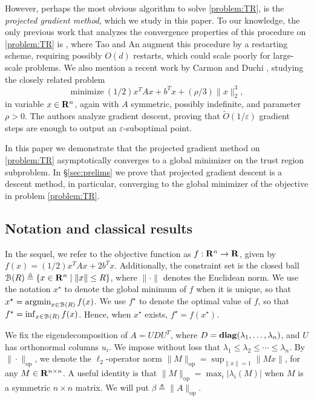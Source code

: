 \documentclass[11pt]{article}
\let\epsilon\varepsilon
\begin{document}
However, perhaps the most obvious algorithm to solve \eqref{problem:TR}, is the
\emph{projected gradient method}, which we study in this paper. To our knowledge, the only previous work 
that analyzes the convergence properties of this procedure on 
\eqref{problem:TR} is \cite{tao1998}, where Tao and An augment this procedure by a restarting scheme, requiring 
possibly $O(d)$ restarts, which could scale poorly for large-scale problems. 
We also mention a recent work by Carmon and Duchi \cite{carmon2016}, studying the closely related problem
\begin{equation}\label{problem:QP}
\text{minimize}~ (1/2)x^T A x + b^Tx + (\rho/3) \|x\|_2^3,
\end{equation}
in variable $x \in \mathbf{R}^n$, again with $A$ symmetric, possibly indefinite, and parameter $\rho > 0$. The 
authors analyze gradient descent, proving that $\tilde O(1/\epsilon)$ gradient steps are enough to output an $\epsilon$-suboptimal point.

In this paper we demonstrate that the projected gradient method on \eqref{problem:TR} 
asymptotically converges to a global minimizer on the trust region subproblem. In \S\ref{sec:prelims} 
we prove that projected gradient descent is a descent method, in particular, converging to 
the global minimizer of the objective in problem \eqref{problem:TR}. 

\subsection{Notation and classical results}
In the sequel, we refer to the objective function as $f: \mathbf{R}^n \to \mathbf{R}$, given by $f(x) = (1/2)x^T Ax + 2b^T x$.
Additionally, the constraint set is the closed ball
$\mathcal{B}(R) \triangleq \{x \in \mathbf{R}^n \mid \|x\| \leq R\}$, 
where $\|\cdot\|$ denotes the Euclidean norm. We use the notation $x^\star$ to denote the global minimum of $f$ when it is unique,
so that $x^\star = \mathop{\rm argmin}_{x \in \mathcal{B}(R)} f(x)$. We use $f^\star$ to denote the optimal value of $f$, so that
$f^\star = \inf_{x \in \mathcal{B}(R)} f(x)$. Hence, when $x^\star$ exists, $f^\star = f(x^\star)$. 

We fix the eigendecomposition of $A = UDU^T$, where $D = \mathop{\bf diag}(\lambda_1, \dots, \lambda_n)$, and $U$ has orthonormal
columns $u_i$. We impose without loss that $\lambda_1 \leq \lambda_2 \leq \cdots \leq \lambda_n$. 
By $\|\cdot\|_\mathrm{op}$, we denote the $\ell_2$-operator norm 
$\|M\|_\mathrm{op} = \sup_{\|x\| = 1} 
\|Mx\|$, for any $M \in \mathbf{R}^{n \times n}$. 
A useful identity is that 
$\|M\|_\mathrm{op} = \max_i |\lambda_i(M)|$ when 
$M$ is a symmetric $n \times n$ matrix. We will put $\beta \triangleq \|A\|_{\mathrm{op}}$.
\end{document}
